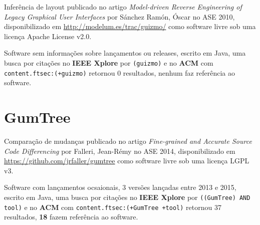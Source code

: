 Inferência de layout
publicado no artigo {\it Model-driven Reverse Engineering of Legacy Graphical User Interfaces}
por S\'{a}nchez Ram\'{o}n, \'{O}scar
no ASE 2010,
disponibilizado em \url{http://modelum.es/trac/guizmo/}
como software livre
sob uma licença Apache License v2.0.

Software sem informações sobre lançamentos ou releases,
escrito em Java,
uma busca por citações no {\bf IEEE Xplore} por
\texttt{(guizmo)}
e no {\bf ACM} com
\texttt{content.ftsec:(+guizmo)}
retornou
0 resultados,
nenhum faz referência ao software.


\section{GumTree}

Comparação de mudanças
publicado no artigo {\it Fine-grained and Accurate Source Code Differencing}
por Falleri, Jean-R{\'e}my
no ASE 2014,
disponibilizado em \url{https://github.com/jrfaller/gumtree}
como software livre
sob uma licença LGPL v3.

Software com lançamentos ocsaionais,
3 versões lançadas
entre 2013 e 2015,
escrito em Java,
uma busca por citações no {\bf IEEE Xplore} por
\texttt{((GumTree) AND tool)}
e no {\bf ACM} com
\texttt{content.ftsec:(+GumTree +tool)}
retornou
37 resultados,
{\bf 18} fazem referência ao software.

